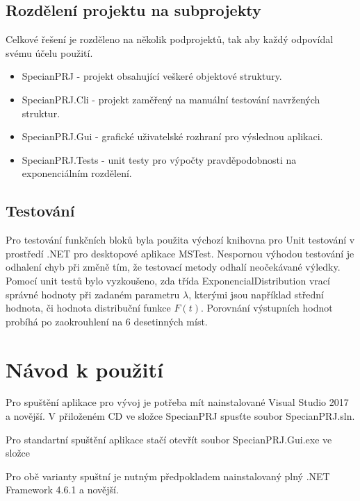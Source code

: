 \documentclass[FM,RP]{tulthesis}
\begin{document}
    \section*{Rozdělení projektu na subprojekty}
        Celkové řešení je rozděleno na několik podprojektů, tak aby každý odpovídal svému účelu použití.
        \begin{itemize} 
        \item SpecianPRJ - projekt obsahující veškeré objektové struktury.
        \item SpecianPRJ.Cli - projekt zaměřený na manuální testování navržených struktur.
        \item SpecianPRJ.Gui - grafické uživatelské rozhraní pro výslednou aplikaci.
        \item SpecianPRJ.Tests - unit testy pro výpočty pravděpodobnosti na exponenciálním rozdělení.
        \end{itemize}

    \section*{Testování}
        Pro testování funkčních bloků byla použita výchozí knihovna pro Unit testování v prostředí .NET pro desktopové aplikace MSTest.
        Nespornou výhodou testování je odhalení chyb při změně tím, že testovací metody odhalí neočekávané výledky.
        Pomocí unit testů bylo vyzkoušeno, zda třída ExponencialDistribution vrací správné hodnoty při zadaném parametru $ \lambda $, 
        kterými jsou například střední hodnota, či hodnota distribuční funkce $ F(t) $. Porovnání výstupních hodnot probíhá po zaokrouhlení na 6 desetinných míst.

\chapter{Návod k použití}

    Pro spuštění aplikace pro vývoj je potřeba mít nainstalované Visual Studio 2017 a novější. 
    V přiloženém CD ve složce SpecianPRJ spusťte soubor SpecianPRJ.sln. 

    Pro standartní spuštění aplikace stačí otevřít soubor SpecianPRJ.Gui.exe ve složce 

    Pro obě varianty spuštní je nutným předpokladem nainstalovaný plný .NET Framework 4.6.1 a novější. 
\end{document}
